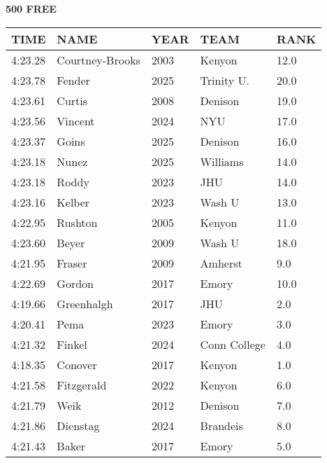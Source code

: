 \begin{minipage}[t]{0.48\textwidth}
\centering
\textbf{500 FREE}\\[0.05cm]
\begin{tabular}{@{}p{1.8cm}p{2.8cm}p{1.2cm}p{1.4cm}p{0.8cm}@{}}
\hline
\textbf{TIME} & \textbf{NAME} & \textbf{YEAR} & \textbf{TEAM} & \textbf{RANK} \\
\hline
4:23.28 & Courtney-Brooks & 2003 & Kenyon & 12.0 \\
4:23.78 & Fender & 2025 & Trinity U. & 20.0 \\
4:23.61 & Curtis & 2008 & Denison & 19.0 \\
4:23.56 & Vincent & 2024 & NYU & 17.0 \\
4:23.37 & Goins & 2025 & Denison & 16.0 \\
4:23.18 & Nunez & 2025 & Williams & 14.0 \\
4:23.18 & Roddy & 2023 & JHU & 14.0 \\
4:23.16 & Kelber & 2023 & Wash U & 13.0 \\
4:22.95 & Rushton & 2005 & Kenyon & 11.0 \\
4:23.60 & Beyer & 2009 & Wash U & 18.0 \\
4:21.95 & Fraser & 2009 & Amherst & 9.0 \\
4:22.69 & Gordon & 2017 & Emory & 10.0 \\
4:19.66 & Greenhalgh & 2017 & JHU & 2.0 \\
4:20.41 & Pema & 2023 & Emory & 3.0 \\
4:21.32 & Finkel & 2024 & Conn College & 4.0 \\
4:18.35 & Conover & 2017 & Kenyon & 1.0 \\
4:21.58 & Fitzgerald & 2022 & Kenyon & 6.0 \\
4:21.79 & Weik & 2012 & Denison & 7.0 \\
4:21.86 & Dienstag & 2024 & Brandeis & 8.0 \\
4:21.43 & Baker & 2017 & Emory & 5.0 \\
\hline
\end{tabular}
\end{minipage}

\vspace{0.4cm}

